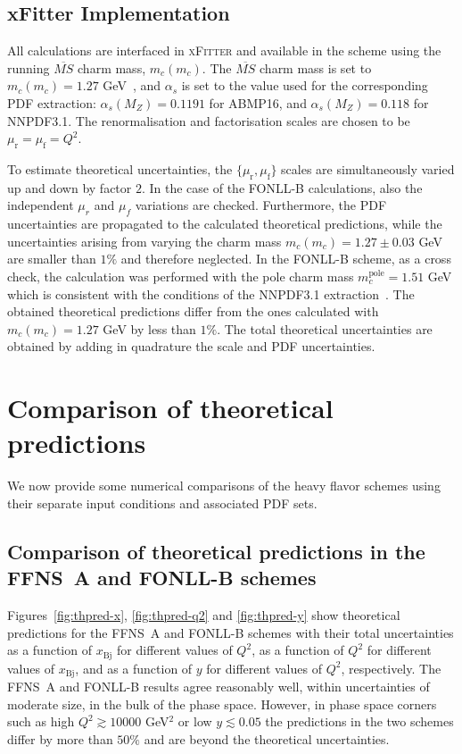 \documentclass[pdftex,twocolumn,epjc3]{svjour3}          %
\newcommand{\abmp} {ABMP16\xspace}
\newcommand{\nnpdf} {NNPDF3.1\xspace}
\newcommand{\xfitter} {\textsc{xFitter}\xspace}
\newcommand{\xbj}{\ensuremath{x_{\text{Bj}}}\xspace}
\newcommand{\fonll} {{FONLL-B}\xspace}
\newcommand{\ffns} {{FFNS~A}\xspace}
\begin{document}
\subsection{xFitter Implementation}

All calculations are interfaced in \xfitter and available in the
scheme using the running $\overline{MS}$ charm mass, $m_c(m_c)$.  The
$\overline{MS}$ charm mass is set to $m_c(m_c) = 1.27$ GeV~\cite{Tanabashi:2018oca},
and $\alpha_s$ is set to the value used for the corresponding PDF
extraction: $\alpha_s(M_Z) = 0.1191$ for \abmp, and $\alpha_s(M_Z) =
0.118$ for \nnpdf.  The renormalisation and factorisation scales are
chosen to be $\mu_\mathrm{r} = \mu_\mathrm{f} = Q^2$.

To estimate theoretical uncertainties, the   $\{\mu_\mathrm{r} , \mu_\mathrm{f}\}$ scales are
simultaneously varied up and down by factor $2$. In the case of the
\fonll calculations, also the independent $\mu_r$ and $\mu_f$
variations are checked. Furthermore, the PDF uncertainties are
propagated to the calculated theoretical predictions, while the
uncertainties arising from varying the charm mass $m_c(m_c) = 1.27 \pm
0.03$ GeV are smaller than $1\%$ and therefore neglected. In the
\fonll scheme, as a cross check, the calculation was performed with
the pole charm mass $m_c^{\text{pole}} = 1.51$ GeV which is consistent
with the conditions of the \nnpdf extraction~\cite{Ball:2017nwa}. The
obtained theoretical predictions differ from the ones calculated with
$m_c(m_c) = 1.27$ GeV by less than $1\%$.  The total theoretical
uncertainties are obtained by adding in quadrature the scale and PDF
uncertainties.


\section{Comparison of theoretical predictions}
\label{sec:thpred-comparison}

We now provide some numerical  comparisons of the
heavy flavor schemes using their separate input conditions
and associated PDF sets. 


\subsection{Comparison of theoretical predictions in the \ffns and \fonll schemes}
\label{sec:compareI}


Figures~\ref{fig:thpred-x}, \ref{fig:thpred-q2} and \ref{fig:thpred-y}
show theoretical predictions
 for the \ffns and \fonll schemes 
 with their total uncertainties 
 as a function of \xbj for different values of $Q^2$,
 as a function of $Q^2$ for different values of \xbj,
 and as a function of $y$ for different values of $Q^2$, respectively.
%
The \ffns and \fonll results 
agree reasonably well, within uncertainties of moderate size, in the
bulk of the phase space. However, in phase space corners such as high
$Q^2 \gtrsim 10000$ GeV$^2$ or low $y \lesssim 0.05$ the predictions
in the two schemes differ by more than $50\%$ and are beyond the 
theoretical uncertainties.
\end{document}
